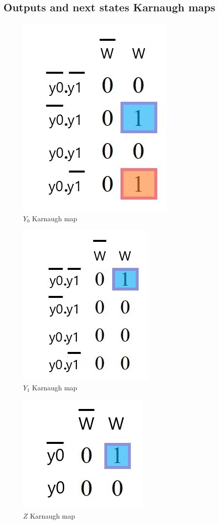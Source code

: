 \documentclass[../../e3_tp3_main.tex]{subfiles}
\begin{document}
\subsection{Outputs and next states Karnaugh maps}

\begin{figure}[H]
	\centering
	\includegraphics[scale=1]{figures/e3_tp3_ej3_moore_y0_kmap.jpg}
	\caption{$Y_0$ Karnaugh map}
\end{figure}

\begin{figure}[H]
	\centering
	\includegraphics[scale=1]{figures/e3_tp3_ej3_moore_y1_kmap.jpg}
	\caption{$Y_1$ Karnaugh map}
\end{figure}

\begin{figure}[H]
	\centering
	\includegraphics[scale=0.9]{figures/e3_tp3_ej3_moore_z_kmap.jpg}
	\caption{$Z$ Karnaugh map}
\end{figure}
\end{document}
